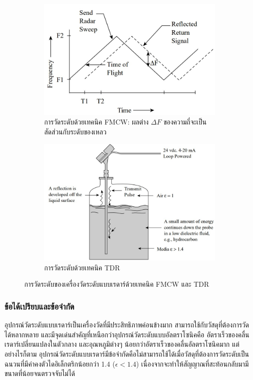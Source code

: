 \documentclass[final,11pt,a4paper]{article}
\begin{document}
\begin{figure}
    \begin{subfigure}[b]{0.4\textwidth}
        \centering
        \includegraphics[width=\textwidth]{images/Screenshot_19.jpg}
        \caption{การวัดระดับด้วยเทคนิค FMCW: ผลต่าง $\Delta F$ ของความถี่จะเป็นสัดส่วนกับระดับของเหลว}
        \label{fig:rtl1}
    \end{subfigure}
    \hfill
    \begin{subfigure}[b]{0.6\textwidth}
        \centering
        \includegraphics[width=\textwidth]{images/Screenshot_18.jpg}
        \caption{การวัดระดับด้วยเทคนิค TDR}
        \label{fig:rtl2}
    \end{subfigure}
    \hfill
    \caption{การวัดระดับของเครื่องวัดระดับแบบเรดาร์ด้วยเทคนิค FMCW และ TDR}
    \label{fig:rtl}
\end{figure}

\subsubsection{ข้อได้เปรียบและข้อจำกัด}
อุปกรณ์วัดระดับแบบเรดาร์เป็นเครื่องวัดที่มีประสิทธิภาพค่อนข้างมาก สามารถใช้กับวัสดุที่ต้องการวัดได้หลากหลาย และมีจุดเด่นสำคัญที่เหนือกว่าอุปกรณ์วัดระดับแบบอัลตราโซนิคคือ
อัตราเร็วของคลื่นเรดาร์เปลี่ยนแปลงในตัวกลาง และอุณหภูมิต่างๆ น้อยกว่าอัตราเร็วของคลื่นอัลตราโซนิคมาก แต่อย่างไรก็ตาม 
อุปกรณ์วัดระดับแบบเรดาร์มีข้อจำกัดคือไม่สามารถใช้ได้เมื่อวัสดุที่ต้องการวัดระดับเป็นฉนวนที่มีค่าคงตัวไดอิเล็กตริกน้อยกว่า 1.4 ($\epsilon < 1.4$) 
เนื่องจากจะทำให้สัญญาณที่สะท้อนกลับมามีขนาดที่น้อยจนตรวจจับไม่ได้
\end{document}
